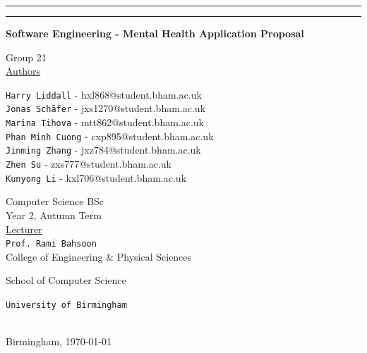 \documentclass[a4paper,11pt]{article} %
\begin{document}
\thispagestyle{empty}
\begin{center}
    \rule{\textwidth}{0.5mm}\vspace{7mm}
    \Large{}\par
    \vspace{5mm}
    \rule{\textwidth}{0.5mm}\par
    \vspace{13mm}

    \large{\textbf{Software Engineering - Mental Health Application Proposal}}\par
    \vspace{5mm}
    \Large{Group 21}\\
    \vspace{5mm}
    \large
    \underline{Authors}\\
    \vspace{4mm}
    \normalsize

    \texttt{Harry Liddall} - hxl868@student.bham.ac.uk\\
    \texttt{Jonas Schäfer} - jxs1270@student.bham.ac.uk\\
    \texttt{Marina Tihova} - mtt862@student.bham.ac.uk\\
    \texttt{Phan Minh Cuong} - cxp895@student.bham.ac.uk\\
    \texttt{Jinming Zhang} - jxz784@student.bham.ac.uk\\
    \texttt{Zhen Su} - zxs777@student.bham.ac.uk\\
    \texttt{Kunyong Li} - kxl706@student.bham.ac.uk\\
    \vspace{10mm}

    \large
    Computer Science BSc \\
    \vspace{1mm}
    Year 2, Autumn Term \\
    \vspace{5mm}
    \Large{\underline{Lecturer}}\\
    \vspace{2mm}
    \large
    \texttt{Prof. Rami Bahsoon}\\
    \vspace{10mm}
    College of Engineering \& Physical Sciences\par
    \vspace{3mm}
    School of Computer Science


    \vspace{15mm}

    \Large{\texttt{University of Birmingham}}\par
    \ \\
    \vspace{5mm}
    \normalsize
    Birmingham, \today\par
\end{center}
\end{document}
